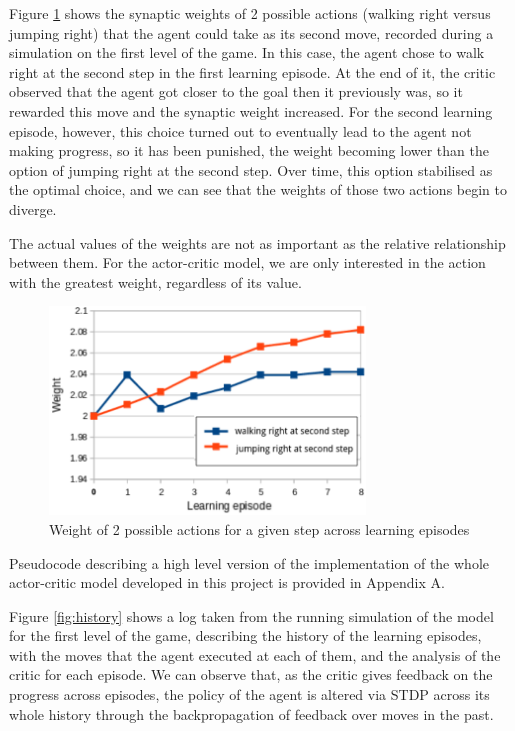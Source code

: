 \documentclass[10pt]{article}
\begin{document}
    Figure \ref{fig:learning} shows the synaptic weights of 2 possible actions (walking right versus jumping right) that the agent could take as its second move, recorded during a simulation on the first level of the game. In this case, the agent chose to walk right at the second step in the first learning episode. At the end of it, the critic observed that the agent got closer to the goal then it previously was, so it rewarded this move and the synaptic weight increased. For the second learning episode, however, this choice turned out to eventually lead to the agent not making progress, so it has been punished, the weight becoming lower than the option of jumping right at the second step. Over time, this option stabilised as the optimal choice, and we can see that the weights of those two actions begin to diverge.

    The actual values of the weights are not as important as the relative relationship between them. For the actor-critic model, we are only interested in the action with the greatest weight, regardless of its value.

    \begin{figure}[ht!]
    \centering
    \includegraphics[width=84mm]{./learning.png}
    \caption{Weight of 2 possible actions for a given step across learning episodes}
    \label{fig:learning}
    \end{figure}
    \setcounter{figure}{9}

    Pseudocode describing a high level version of the implementation of the whole actor-critic model developed in this project is provided in Appendix A.

    Figure \ref{fig:history} shows a log taken from the running simulation of the model for the first level of the game, describing the history of the learning episodes, with the moves that the agent executed at each of them, and the analysis of the critic for each episode. We can observe that, as the critic gives feedback on the progress across episodes, the policy of the agent is altered via STDP across its whole history through the backpropagation of feedback over moves in the past.
    
\end{document}
